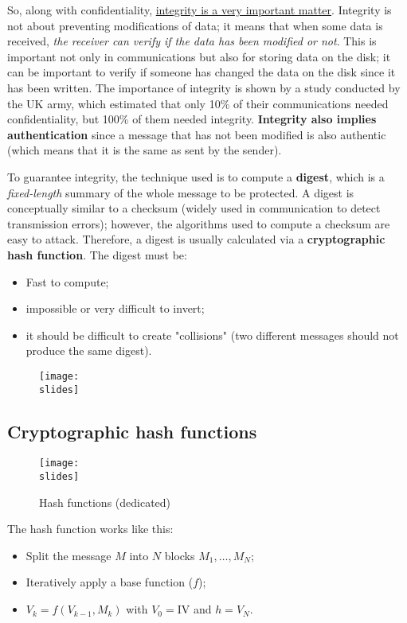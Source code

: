 So, along with confidentiality, \underline{integrity is a very important matter}. Integrity is not about preventing modifications of data; it means that when some data is received, \textit{the receiver can verify if the data has been modified or not}. This is important not only in communications but also for storing data on the disk; it can be important to verify if someone has changed the data on the disk since it has been written.
The importance of integrity is shown by a study conducted by the UK army, which estimated that only 10\% of their communications needed confidentiality, but 100\% of them needed integrity. \textbf{Integrity also implies authentication} since a message that has not been modified is also authentic (which means that it is the same as sent by the sender).

To guarantee integrity, the technique used is to compute a \textbf{digest}, which is a \textit{fixed-length} summary of the whole message to be protected. A digest is conceptually similar to a checksum (widely used in communication to detect transmission errors); however, the algorithms used to compute a checksum are easy to attack. Therefore, a digest is usually calculated via a \textbf{cryptographic hash function}. The digest must be:
\begin{itemize}
    \item Fast to compute;
    \item impossible or very difficult to invert;
    \item it should be difficult to create "collisions" (two different messages should not produce the same
          digest).
\end{itemize}

\begin{figure}[h]
    \centering
    \texttt{[image: \\slides]}
\end{figure}

\subsection{Cryptographic hash functions}
\begin{figure}[h]
    \centering
    \texttt{[image: \\slides]}
    \caption{Hash functions (dedicated)}
\end{figure}
The hash function works like this:
\begin{itemize}
    \item Split the message $M$ into $N$ blocks \(M_1, \ldots, M_N\);
    \item Iteratively apply a base function (\(f\));
    \item \(V_k = f(V_{k-1}, M_k)\) with \(V_0 = \text{IV}\) and \(h = V_N\).
\end{itemize}

